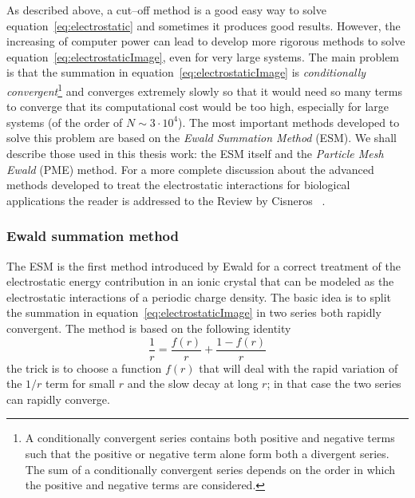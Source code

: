 As described above, a cut--off method is a good easy way to solve equation~\eqref{eq:electrostatic} and sometimes it produces good results. However, the increasing of computer power can lead to develop more rigorous methods to solve equation~\eqref{eq:electrostaticImage}, even for very large systems. The main problem is that the summation in equation~\eqref{eq:electrostaticImage} is \textit{conditionally convergent}\footnote{A conditionally convergent series contains both positive and negative terms such that the positive or negative term alone form both a divergent series. The sum of a conditionally convergent series depends on the order in which the positive and negative terms are considered.} and converges extremely slowly so that it would need so many terms to converge that its computational cost would be too high, especially for large systems (of the order of $N \sim 3\cdot 10^4$). The most important methods developed to solve this problem are based on the \textit{Ewald Summation Method} (\acs{ESM}). We shall describe those used in this thesis work: the \ac{ESM} itself and the \textit{Particle Mesh Ewald} (\acs{PME}) method. For a more complete discussion about the advanced methods developed to treat the electrostatic interactions for biological applications the reader is addressed to the Review by Cisneros \etal\, \cite{Cisneros}.

\subsubsection{Ewald summation method} %
The \acf{ESM} is the first method introduced by Ewald
for a correct treatment of the electrostatic energy contribution in an ionic crystal that can be modeled as the electrostatic interactions of a periodic charge density. The basic idea is to split the summation in equation~\eqref{eq:electrostaticImage} in two series both rapidly convergent. The method is based on the following identity
\begin{equation}
	\frac{1}{r} = \frac{f(r)}{r} + \frac{1 - f(r)}{r}
	\label{eq:ewaldTrick}
\end{equation}
the trick is to choose a function $f(r)$ that will deal with the rapid variation of the $1/r$ term for small $r$ and the slow decay at long $r$; in that case the two series can rapidly converge.

